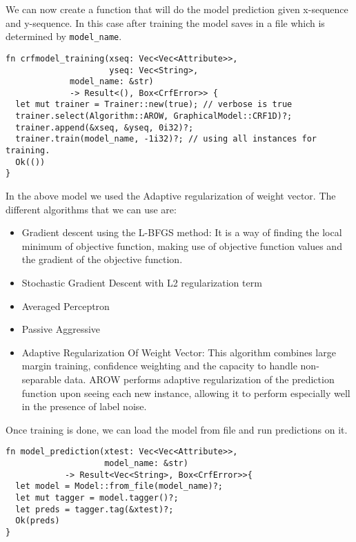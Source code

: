 \documentclass{book}
\begin{document}
We can now create a function that will do the model prediction given x-sequence and y-sequence. In this case after training the model saves in a file which is determined by \lstinline{model_name}.

\begin{lstlisting}[caption={chapter5\\/crfsuite\\-model\\/src\\/main\\.rs}, basicstyle=\small]
fn crfmodel_training(xseq: Vec<Vec<Attribute>>,
                     yseq: Vec<String>,
		     model_name: &str)
		     -> Result<(), Box<CrfError>> {
  let mut trainer = Trainer::new(true); // verbose is true
  trainer.select(Algorithm::AROW, GraphicalModel::CRF1D)?;
  trainer.append(&xseq, &yseq, 0i32)?;
  trainer.train(model_name, -1i32)?; // using all instances for training.
  Ok(())
}
\end{lstlisting}

In the above model we used the Adaptive regularization of weight vector. The different algorithms that we can use are:

\begin{itemize}
	\item Gradient descent using the L-BFGS method: It is a way of finding the local minimum of objective function, making use of objective function values and the gradient of the objective function.
	\item Stochastic Gradient Descent with L2 regularization term
	\item Averaged Perceptron
	\item Passive Aggressive
	\item Adaptive Regularization Of Weight Vector: This algorithm combines large margin training, confidence weighting and the capacity to handle non-separable data. AROW performs adaptive regularization of the prediction function upon seeing each new instance, allowing it to perform especially well in the presence of label noise.
\end{itemize}

Once training is done, we can load the model from file and run predictions on it.

\begin{lstlisting}[caption={chapter5\\/crfsuite\\-model\\/src\\/main\\.rs}, basicstyle=\small]
fn model_prediction(xtest: Vec<Vec<Attribute>>,
                    model_name: &str)
		    -> Result<Vec<String>, Box<CrfError>>{
  let model = Model::from_file(model_name)?;
  let mut tagger = model.tagger()?;
  let preds = tagger.tag(&xtest)?;
  Ok(preds)
}
\end{lstlisting}
\end{document}
